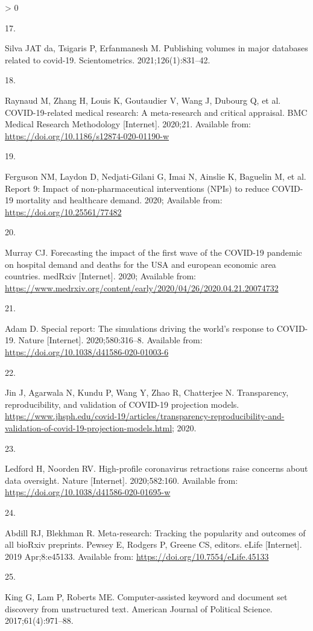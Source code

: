 \documentclass[
]{article}
\newlength{\cslhangindent}
\newlength{\csllabelwidth}
\newenvironment{CSLReferences}[2] %
 {%
  \setlength{\parindent}{0pt}
  \ifodd #1 \everypar{\setlength{\hangindent}{\cslhangindent}}\ignorespaces\fi
  \ifnum #2 > 0
  \setlength{\parskip}{#2\baselineskip}
  \fi
 }%
 {}
\newcommand{\CSLLeftMargin}[1]{\parbox[t]{\csllabelwidth}{#1}}
\newcommand{\CSLRightInline}[1]{\parbox[t]{\linewidth - \csllabelwidth}{#1}\break}
\begin{document}
\begin{CSLReferences}{0}{0}
\leavevmode\hypertarget{ref-da2021publishing}{}%
\CSLLeftMargin{17. }
\CSLRightInline{Silva JAT da, Tsigaris P, Erfanmanesh M. Publishing volumes in major databases related to covid-19. Scientometrics. 2021;126(1):831--42. }

\leavevmode\hypertarget{ref-raynaud2021}{}%
\CSLLeftMargin{18. }
\CSLRightInline{Raynaud M, Zhang H, Louis K, Goutaudier V, Wang J, Dubourg Q, et al. COVID-19-related medical research: A meta-research and critical appraisal. BMC Medical Research Methodology {[}Internet{]}. 2020;21. Available from: \url{https://doi.org/10.1186/s12874-020-01190-w}}

\leavevmode\hypertarget{ref-ferguson2020}{}%
\CSLLeftMargin{19. }
\CSLRightInline{Ferguson NM, Laydon D, Nedjati-Gilani G, Imai N, Ainslie K, Baguelin M, et al. Report 9: Impact of non-pharmaceutical interventions (NPIs) to reduce COVID-19 mortality and healthcare demand. 2020; Available from: \url{https://doi.org/10.25561/77482}}

\leavevmode\hypertarget{ref-murray2020}{}%
\CSLLeftMargin{20. }
\CSLRightInline{Murray CJ. Forecasting the impact of the first wave of the COVID-19 pandemic on hospital demand and deaths for the USA and european economic area countries. medRxiv {[}Internet{]}. 2020; Available from: \url{https://www.medrxiv.org/content/early/2020/04/26/2020.04.21.20074732}}

\leavevmode\hypertarget{ref-adam2020}{}%
\CSLLeftMargin{21. }
\CSLRightInline{Adam D. Special report: The simulations driving the world's response to COVID-19. Nature {[}Internet{]}. 2020;580:316--8. Available from: \url{https://doi.org/10.1038/d41586-020-01003-6}}

\leavevmode\hypertarget{ref-jin2020}{}%
\CSLLeftMargin{22. }
\CSLRightInline{Jin J, Agarwala N, Kundu P, Wang Y, Zhao R, Chatterjee N. Transparency, reproducibility, and validation of COVID-19 projection models. \url{https://www.jhsph.edu/covid-19/articles/transparency-reproducibility-and-validation-of-covid-19-projection-models.html}; 2020. }

\leavevmode\hypertarget{ref-ledford2020}{}%
\CSLLeftMargin{23. }
\CSLRightInline{Ledford H, Noorden RV. High-profile coronavirus retractions raise concerns about data oversight. Nature {[}Internet{]}. 2020;582:160. Available from: \url{https://doi.org/10.1038/d41586-020-01695-w}}

\leavevmode\hypertarget{ref-abdill2019}{}%
\CSLLeftMargin{24. }
\CSLRightInline{Abdill RJ, Blekhman R. Meta-research: Tracking the popularity and outcomes of all bioRxiv preprints. Pewsey E, Rodgers P, Greene CS, editors. eLife {[}Internet{]}. 2019 Apr;8:e45133. Available from: \url{https://doi.org/10.7554/eLife.45133}}

\leavevmode\hypertarget{ref-king2017computer}{}%
\CSLLeftMargin{25. }
\CSLRightInline{King G, Lam P, Roberts ME. Computer-assisted keyword and document set discovery from unstructured text. American Journal of Political Science. 2017;61(4):971--88. }

\end{CSLReferences}
\end{document}
